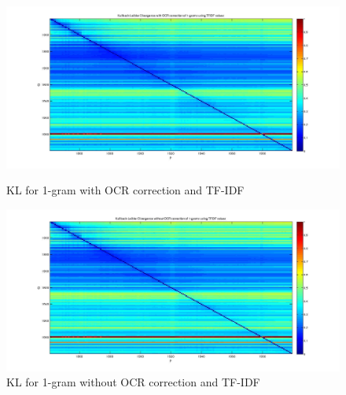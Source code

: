 \begin{figure}[h!]
    \begin{minipage}[b]{0.48\linewidth}
        \includegraphics[scale=0.15]{Pictures/kullback-leibler/KL_1-grams_with_correction_tfidf.jpg}
        \caption{KL for 1-gram with OCR correction and TF-IDF}
        \label{}
    \end{minipage}\hfill
    \begin{minipage}[b]{0.5\linewidth}
        \includegraphics[scale=0.15]{Pictures/kullback-leibler/KL_1-grams_without_correction_tfidf.jpg}
        \caption{KL for 1-gram without OCR correction and TF-IDF}
        \label{}
    \end{minipage}\hfill
\end{figure}

